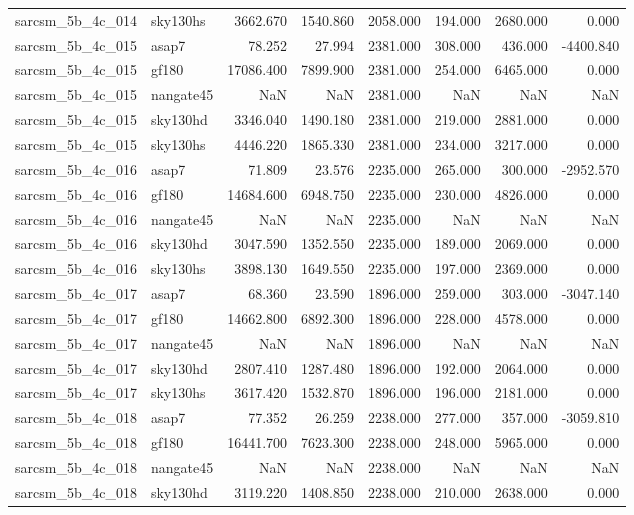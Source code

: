 \begin{tabular}{llrrrrrr}
sarcsm\_5b\_4c\_014 & sky130hs & 3662.670 & 1540.860 & 2058.000 & 194.000 & 2680.000 & 0.000 \\
sarcsm\_5b\_4c\_015 & asap7 & 78.252 & 27.994 & 2381.000 & 308.000 & 436.000 & -4400.840 \\
sarcsm\_5b\_4c\_015 & gf180 & 17086.400 & 7899.900 & 2381.000 & 254.000 & 6465.000 & 0.000 \\
sarcsm\_5b\_4c\_015 & nangate45 & NaN & NaN & 2381.000 & NaN & NaN & NaN \\
sarcsm\_5b\_4c\_015 & sky130hd & 3346.040 & 1490.180 & 2381.000 & 219.000 & 2881.000 & 0.000 \\
sarcsm\_5b\_4c\_015 & sky130hs & 4446.220 & 1865.330 & 2381.000 & 234.000 & 3217.000 & 0.000 \\
sarcsm\_5b\_4c\_016 & asap7 & 71.809 & 23.576 & 2235.000 & 265.000 & 300.000 & -2952.570 \\
sarcsm\_5b\_4c\_016 & gf180 & 14684.600 & 6948.750 & 2235.000 & 230.000 & 4826.000 & 0.000 \\
sarcsm\_5b\_4c\_016 & nangate45 & NaN & NaN & 2235.000 & NaN & NaN & NaN \\
sarcsm\_5b\_4c\_016 & sky130hd & 3047.590 & 1352.550 & 2235.000 & 189.000 & 2069.000 & 0.000 \\
sarcsm\_5b\_4c\_016 & sky130hs & 3898.130 & 1649.550 & 2235.000 & 197.000 & 2369.000 & 0.000 \\
sarcsm\_5b\_4c\_017 & asap7 & 68.360 & 23.590 & 1896.000 & 259.000 & 303.000 & -3047.140 \\
sarcsm\_5b\_4c\_017 & gf180 & 14662.800 & 6892.300 & 1896.000 & 228.000 & 4578.000 & 0.000 \\
sarcsm\_5b\_4c\_017 & nangate45 & NaN & NaN & 1896.000 & NaN & NaN & NaN \\
sarcsm\_5b\_4c\_017 & sky130hd & 2807.410 & 1287.480 & 1896.000 & 192.000 & 2064.000 & 0.000 \\
sarcsm\_5b\_4c\_017 & sky130hs & 3617.420 & 1532.870 & 1896.000 & 196.000 & 2181.000 & 0.000 \\
sarcsm\_5b\_4c\_018 & asap7 & 77.352 & 26.259 & 2238.000 & 277.000 & 357.000 & -3059.810 \\
sarcsm\_5b\_4c\_018 & gf180 & 16441.700 & 7623.300 & 2238.000 & 248.000 & 5965.000 & 0.000 \\
sarcsm\_5b\_4c\_018 & nangate45 & NaN & NaN & 2238.000 & NaN & NaN & NaN \\
sarcsm\_5b\_4c\_018 & sky130hd & 3119.220 & 1408.850 & 2238.000 & 210.000 & 2638.000 & 0.000 \\

\end{tabular}
